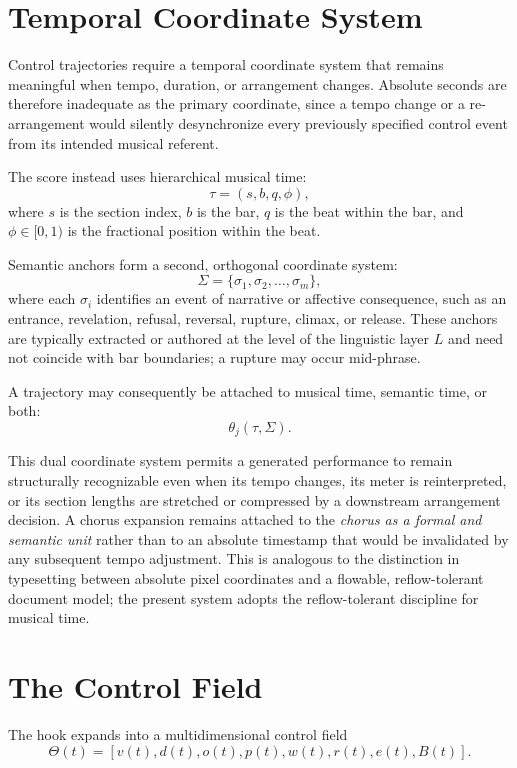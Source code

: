 \documentclass[11pt]{article}
\begin{document}
\section{Temporal Coordinate System}

Control trajectories require a temporal coordinate system that remains meaningful when tempo, duration, or arrangement changes. Absolute seconds are therefore inadequate as the primary coordinate, since a tempo change or a re-arrangement would silently desynchronize every previously specified control event from its intended musical referent.

The score instead uses hierarchical musical time:
\[
\tau=(s,b,q,\phi),
\]
where $s$ is the section index, $b$ is the bar, $q$ is the beat within the bar, and $\phi\in[0,1)$ is the fractional position within the beat.

Semantic anchors form a second, orthogonal coordinate system:
\[
\Sigma=
\{
\sigma_1,\sigma_2,\ldots,\sigma_m
\},
\]
where each $\sigma_i$ identifies an event of narrative or affective consequence, such as an entrance, revelation, refusal, reversal, rupture, climax, or release. These anchors are typically extracted or authored at the level of the linguistic layer $L$ and need not coincide with bar boundaries; a rupture may occur mid-phrase.

A trajectory may consequently be attached to musical time, semantic time, or both:
\[
\theta_j(\tau,\Sigma).
\]

This dual coordinate system permits a generated performance to remain structurally recognizable even when its tempo changes, its meter is reinterpreted, or its section lengths are stretched or compressed by a downstream arrangement decision. A chorus expansion remains attached to the \emph{chorus as a formal and semantic unit} rather than to an absolute timestamp that would be invalidated by any subsequent tempo adjustment. This is analogous to the distinction in typesetting between absolute pixel coordinates and a flowable, reflow-tolerant document model; the present system adopts the reflow-tolerant discipline for musical time.

\section{The Control Field}

The hook expands into a multidimensional control field
\[
\Theta(t)=
[
v(t),d(t),o(t),p(t),w(t),r(t),e(t),B(t)
].
\]
\end{document}
